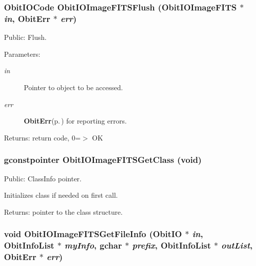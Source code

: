 \subsubsection{\setlength{\rightskip}{0pt plus 5cm}Obit\-IOCode Obit\-IOImage\-FITSFlush ({\bf Obit\-IOImage\-FITS} $\ast$ {\em in}, {\bf Obit\-Err} $\ast$ {\em err})}\label{ObitIOImageFITS_8c_a32}


Public: Flush. 

\begin{Desc}
\item[Parameters:]
\begin{description}
\item[{\em in}]Pointer to object to be accessed. \item[{\em err}]{\bf Obit\-Err}{\rm (p.\,\pageref{structObitErr})} for reporting errors. \end{description}
\end{Desc}
\begin{Desc}
\item[Returns:]return code, 0=$>$ OK \end{Desc}
\subsubsection{\setlength{\rightskip}{0pt plus 5cm}gconstpointer Obit\-IOImage\-FITSGet\-Class (void)}\label{ObitIOImageFITS_8c_a20}


Public: Class\-Info pointer. 

Initializes class if needed on first call. \begin{Desc}
\item[Returns:]pointer to the class structure. \end{Desc}
\subsubsection{\setlength{\rightskip}{0pt plus 5cm}void Obit\-IOImage\-FITSGet\-File\-Info ({\bf Obit\-IO} $\ast$ {\em in}, {\bf Obit\-Info\-List} $\ast$ {\em my\-Info}, gchar $\ast$ {\em prefix}, {\bf Obit\-Info\-List} $\ast$ {\em out\-List}, {\bf Obit\-Err} $\ast$ {\em err})}\label{ObitIOImageFITS_8c_a37}



